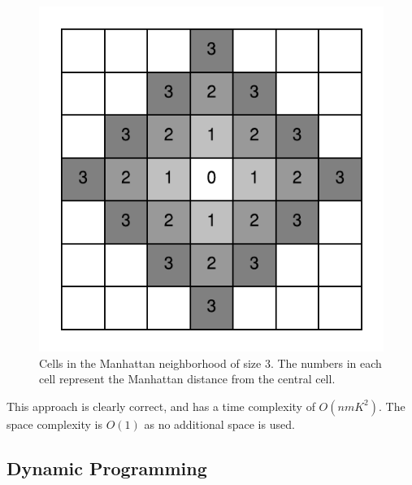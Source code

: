 \begin{figure}
	\centering
	\includegraphics[width=\textwidth]{sources/max_manhattan/images/neighborhood}
	\caption[Cells in the Manhattan neighborhood of size $3$.]{Cells in the Manhattan neighborhood of size $3$. 
	The numbers in each cell represent the Manhattan distance from the central cell.}
	\label{fig:max_manhattan:neighborhood}
\end{figure}
This approach is clearly correct, and has a time complexity of $O(nmK^2)$. The space complexity is $O(1)$ as no additional space is used. 





\subsection{Dynamic Programming}
\label{max_manhattan:sec:DP}
